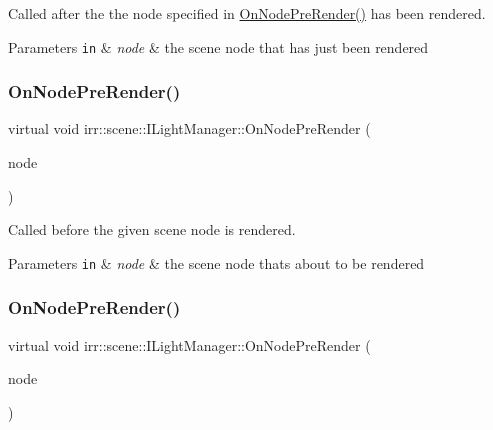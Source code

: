 Called after the the node specified in \hyperlink{classirr_1_1scene_1_1ILightManager_a23ae7bdf54613e6dd41d4138cb6f5edc}{On\+Node\+Pre\+Render()} has been rendered. 


\begin{DoxyParams}[1]{Parameters}
\mbox{\tt in}  & {\em node} & the scene node that has just been rendered \\
\hline
\end{DoxyParams}
\mbox{\label{classirr_1_1scene_1_1ILightManager_a23ae7bdf54613e6dd41d4138cb6f5edc}} 
\subsubsection{\texorpdfstring{On\+Node\+Pre\+Render()}{OnNodePreRender()}\hspace{0.1cm}{\footnotesize\ttfamily [1/2]}}
{\footnotesize\ttfamily virtual void irr\+::scene\+::\+I\+Light\+Manager\+::\+On\+Node\+Pre\+Render (\begin{DoxyParamCaption}\item[{\hyperlink{classirr_1_1scene_1_1ISceneNode}{I\+Scene\+Node} $\ast$}]{node }\end{DoxyParamCaption})\hspace{0.3cm}{\ttfamily [pure virtual]}}



Called before the given scene node is rendered. 


\begin{DoxyParams}[1]{Parameters}
\mbox{\tt in}  & {\em node} & the scene node that\textquotesingle{}s about to be rendered \\
\hline
\end{DoxyParams}
\mbox{\label{classirr_1_1scene_1_1ILightManager_a23ae7bdf54613e6dd41d4138cb6f5edc}} 
\subsubsection{\texorpdfstring{On\+Node\+Pre\+Render()}{OnNodePreRender()}\hspace{0.1cm}{\footnotesize\ttfamily [2/2]}}
{\footnotesize\ttfamily virtual void irr\+::scene\+::\+I\+Light\+Manager\+::\+On\+Node\+Pre\+Render (\begin{DoxyParamCaption}\item[{\hyperlink{classirr_1_1scene_1_1ISceneNode}{I\+Scene\+Node} $\ast$}]{node }\end{DoxyParamCaption})\hspace{0.3cm}{\ttfamily [pure virtual]}}



